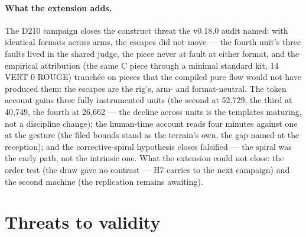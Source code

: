 \documentclass[11pt,a4paper]{article}
\begin{document}
\paragraph{What the extension adds.} The D210 campaign closes the
construct threat the v0.18.0 audit named: with identical formats
across arms, the escapes did not move --- the fourth unit's three
faults lived in the shared judge, the piece never at fault at either
format, and the empirical attribution (the same C piece through a
minimal standard kit, 14 VERT 0 ROUGE) tranch\'ee on pieces that the
compiled pure flow would not have produced them: the escapes are the
rig's, arm- and format-neutral. The token account gains three fully
instrumented units (the second at 52{,}729, the third at 40{,}749,
the fourth at 26{,}662 --- the decline across units is the templates
maturing, not a discipline change); the human-time account reads
four minutes against one at the gesture (the filed bounds stand as
the terrain's own, the gap named at the reception); and the
corrective-spiral hypothesis closes falsified --- the spiral was the
early path, not the intrinsic one. What the extension could not
close: the order test (the draw gave no contrast --- H7 carries to
the next campaign) and the second machine (the replication remains
awaiting).

\section{Threats to validity}\label{sec:threats}
\end{document}
